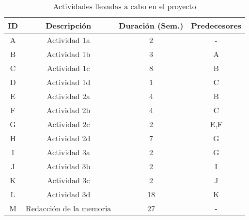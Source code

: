 \begin{table}[H]
\centering
\small
\begin{tabular}{cccc}
\textbf{ID} & \textbf{Descripción} & \textbf{Duración (Sem.)} & \textbf{Predecesores} \\ \hline 

A & Actividad 1a & 2 & - \\
B & Actividad 1b & 3 & A \\
C & Actividad 1c & 8 & B\\
D & Actividad 1d & 1 & C \\ \hline

E & Actividad 2a & 4 & B \\
F & Actividad 2b & 4 & C \\
G & Actividad 2c & 2 & E,F \\
H & Actividad 2d & 7 & G \\ \hline

I & Actividad 3a & 2 & G \\
J & Actividad 3b & 2 & I \\
K & Actividad 3c & 2 & J \\
L & Actividad 3d & 18 & K \\ \hline

M & Redacción de la memoria & 27 & - %
\end{tabular}
\caption{Actividades llevadas a cabo en el proyecto \label{tab:actividades}}
\end{table}

